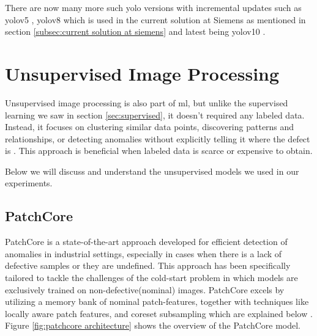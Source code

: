 There are now many more such \gls{yolo} versions with incremental updates such as \gls{yolo}v5 \cite{yolov5}, \gls{yolo}v8 \cite{Ultralytics2024} which is used in the current solution at Siemens as mentioned in section \ref{subsec:current solution at siemens} and latest being \gls{yolo}v10 \cite{Ultralytics2024v10}.

\section{Unsupervised Image Processing}

Unsupervised image processing is also part of \gls{ml}, but unlike the supervised learning we saw in section \ref{sec:supervised}, it doesn't required any labeled data. Instead, it focuses on clustering similar data points, discovering patterns and relationships, or detecting anomalies without explicitly telling it where the defect is \cite{geeksforgeeks-sup-unsup}. This approach is beneficial when labeled data is scarce or expensive to obtain.

Below we will discuss and understand the unsupervised models we used in our experiments.


\subsection{PatchCore}
\label{subsec:patchcore}

PatchCore is a state-of-the-art approach developed for efficient detection of anomalies in industrial settings, especially in cases when there is a lack of defective samples or they are undefined. This approach has been specifically tailored to tackle the challenges of the cold-start problem in which models are exclusively trained on non-defective(nominal) images. PatchCore excels by utilizing a memory bank of nominal patch-features, together with techniques like locally aware patch features, and coreset subsampling which are explained below \cite{roth2022totalrecallindustrialanomaly}. Figure \ref{fig:patchcore architecture} shows the overview of the PatchCore model.

